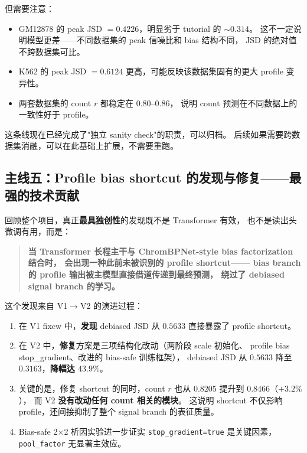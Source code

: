 \documentclass[11pt,a4paper]{ctexart}
\begin{document}
但需要注意：
\begin{itemize}[leftmargin=2em]
  \item GM12878 的 peak JSD $= 0.4226$，明显劣于 tutorial 的 $\sim 0.314$。
        这不一定说明模型更差——不同数据集的 peak 信噪比和 bias 结构不同，
        JSD 的绝对值不跨数据集可比。
  \item K562 的 peak JSD $= 0.6124$ 更高，可能反映该数据集固有的更大 profile 变异性。
  \item 两套数据集的 count $r$ 都稳定在 $0.80$--$0.86$，
        说明 count 预测在不同数据上的一致性好于 profile。
\end{itemize}

这条线现在已经完成了"独立 sanity check"的职责，可以归档。
后续如果需要跨数据集消融，可以在此基础上扩展，不需要重跑。

\subsection{主线五：Profile bias shortcut 的发现与修复——最强的技术贡献}

回顾整个项目，真正\textbf{最具独创性}的发现既不是 Transformer 有效，
也不是读出头微调有用，而是：

\begin{quote}
\textbf{当 Transformer 长程主干与 ChromBPNet-style bias factorization 结合时，
会出现一种此前未被识别的 profile shortcut——
bias branch 的 profile 输出被主模型直接借道传递到最终预测，
绕过了 debiased signal branch 的学习。}
\end{quote}

这个发现来自 V1$\to$V2 的演进过程：

\begin{enumerate}[leftmargin=2em]
  \item 在 V1 fixcw 中，\textbf{发现} debiased JSD 从 $0.5633$ 直接暴露了 profile shortcut。
  \item 在 V2 中，\textbf{修复}方案是三项结构化改动（两阶段 scale 初始化、
        profile bias stop\_gradient、改进的 bias-safe 训练框架），
        debiased JSD 从 $0.5633$ 降至 $0.3163$，\textbf{降幅达 $43.9\%$}。
  \item 关键的是，修复 shortcut 的同时，count $r$ 也从 $0.8205$ 提升到 $0.8466$（$+3.2\%$），
        而 V2 \textbf{没有改动任何 count 相关的模块}。
        这说明 shortcut 不仅影响 profile，还间接抑制了整个 signal branch 的表征质量。
  \item Bias-safe 2$\times$2 析因实验进一步证实 \texttt{stop\_gradient=true}
        是关键因素，\texttt{pool\_factor} 无显著主效应。
\end{enumerate}
\end{document}
